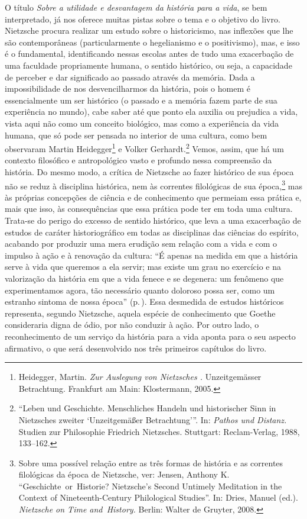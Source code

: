 O título \emph{Sobre a utilidade e desvantagem da história para a vida},
se bem interpretado, já nos oferece muitas pistas sobre o tema e o
objetivo do livro. Nietzsche procura realizar um estudo sobre o
historicismo, nas inflexões que lhe são contemporâneas (particularmente
o hegelianismo e o positivismo), mas, e isso é o fundamental,
identificando nessas escolas antes de tudo uma exacerbação de uma
faculdade propriamente humana, o sentido histórico, ou seja, a
capacidade de perceber e dar significado ao passado através da memória.
Dada a impossibilidade de nos desvencilharmos da história, pois o homem
é essencialmente um ser histórico (o passado e a memória fazem parte de
sua experiência no mundo), cabe saber até que ponto ela auxilia ou
prejudica a vida, vista aqui não como um conceito biológico, mas como a
experiência da vida humana, que só pode ser pensada no interior de uma
cultura, como bem observaram Martin Heidegger\footnote{Heidegger, Martin. 
\emph{Zur Auslegung von Nietzsches .} Unzeitgemässer Betrachtung. 
Frankfurt am Main: Klostermann, 2005.} e Volker Gerhardt.\footnote{``Leben 
und Geschichte. Menschliches Handeln und historischer Sinn in Nietzsches zweiter 
`Unzeitgemäßer Betrachtung'''. In: \emph{Pathos und Distanz.} Studien zur
  Philosophie Friedrich Nietzsches. Stuttgart: Reclam-Verlag, 1988,
  133--162.} Vemos, assim, que há um contexto filosófico e
antropológico vasto e profundo nessa compreensão da história. Do mesmo
modo, a crítica de Nietzsche ao fazer histórico de sua época não se
reduz à disciplina histórica, nem às correntes filológicas de sua
época,\footnote{Sobre uma possível relação entre as três formas de
  história e as correntes filológicas da época de Nietzsche, ver:
  Jensen, Anthony K. ``Geschichte~or~Historie? Nietzsche's
  Second Untimely Meditation in the Context of Nineteenth-Century
  Philological Studies''. In: Dries, Manuel (ed.). \emph{Nietzsche on
  Time and~History.} Berlin: Walter de Gruyter, 2008.} mas às próprias
concepções de ciência e de conhecimento que permeiam essa prática e,
mais que isso, às consequências que essa prática pode ter em toda uma
cultura. Trata-se do perigo do excesso de sentido histórico, que leva a
uma exacerbação de estudos de caráter historiográfico em todas as
disciplinas das ciências do espírito, acabando por produzir uma mera
erudição sem relação com a vida e com o impulso à ação e à renovação da
cultura: ``É apenas na medida em que a história serve à vida que
queremos a ela servir; mas existe um grau no exercício e na valorização
da história em que a vida fenece e se degenera: um fenômeno que
experimentamos agora, tão necessário quanto doloroso possa ser, como um
estranho sintoma de nossa época'' (p.\,\pageref{sintomadenossaepoca}). Essa desmedida de estudos
históricos representa, segundo Nietzsche, aquela espécie de conhecimento
que Goethe consideraria digna de ódio, por não conduzir à ação. Por
outro lado, o reconhecimento de um serviço da história para a vida
aponta para o seu aspecto afirmativo, o que será desenvolvido nos três
primeiros capítulos do livro.

